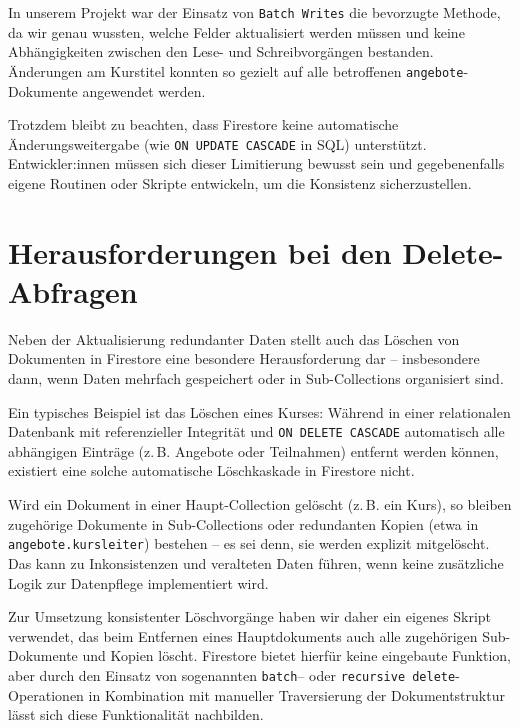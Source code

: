 \documentclass[12pt,a4paper%
              ,oneside     %
              ,titlepage
              ,DIV=13
              ,headinclude
              ,footinclude=false%
              ,cleardoublepage=empty%
              ,parskip=half,
              BCOR=0mm,
              ]{scrreprt}
\begin{document}
In unserem Projekt war der Einsatz von \texttt{Batch Writes} die bevorzugte Methode, da wir genau wussten, welche Felder aktualisiert werden müssen und keine Abhängigkeiten zwischen den Lese- und Schreibvorgängen bestanden. Änderungen am Kurstitel konnten so gezielt auf alle betroffenen \texttt{angebote}-Dokumente angewendet werden.

Trotzdem bleibt zu beachten, dass Firestore keine automatische Änderungsweitergabe (wie \texttt{ON UPDATE CASCADE} in SQL) unterstützt. Entwickler:innen müssen sich dieser Limitierung bewusst sein und gegebenenfalls eigene Routinen oder Skripte entwickeln, um die Konsistenz sicherzustellen.

\chapter{Herausforderungen bei den Delete-Abfragen}
\label{delete-label}

Neben der Aktualisierung redundanter Daten stellt auch das Löschen von Dokumenten in Firestore eine besondere Herausforderung dar – insbesondere dann, wenn Daten mehrfach gespeichert oder in Sub-Collections organisiert sind.

Ein typisches Beispiel ist das Löschen eines Kurses: Während in einer relationalen Datenbank mit referenzieller Integrität und \texttt{ON DELETE CASCADE} automatisch alle abhängigen Einträge (z.\,B. Angebote oder Teilnahmen) entfernt werden können, existiert eine solche automatische Löschkaskade in Firestore nicht.

Wird ein Dokument in einer Haupt-Collection gelöscht (z.\,B. ein Kurs), so bleiben zugehörige Dokumente in Sub-Collections oder redundanten Kopien (etwa in \texttt{angebote.kursleiter}) bestehen – es sei denn, sie werden explizit mitgelöscht. Das kann zu Inkonsistenzen und veralteten Daten führen, wenn keine zusätzliche Logik zur Datenpflege implementiert wird.

Zur Umsetzung konsistenter Löschvorgänge haben wir daher ein eigenes Skript verwendet, das beim Entfernen eines Hauptdokuments auch alle zugehörigen Sub-Dokumente und Kopien löscht. Firestore bietet hierfür keine eingebaute Funktion, aber durch den Einsatz von sogenannten \texttt{batch}– oder \texttt{recursive delete}-Operationen in Kombination mit manueller Traversierung der Dokumentstruktur lässt sich diese Funktionalität nachbilden.
\end{document}
